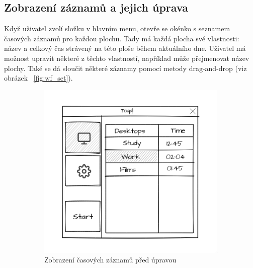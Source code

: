\documentclass[thesis=B,czech]{FITthesis}[2012/06/26]
\begin{document}
\subsection{Zobrazení záznamů a jejich úprava}

Když uživatel zvolí složku  v hlavním menu, otevře se okénko s seznamem časových záznamů pro každou plochu. Tady má každá plocha své vlastnosti: název a celkový čas strávený na této ploše během aktuálního dne.
Uživatel má možnost upravit některé z těchto vlastností, například může přejmenovat název plochy. Také se dá sloučit některé záznamy pomocí metody drag-and-drop (viz obrázek ~\ref{fig:wf_set}). 

\begin{figure}
	\begin{subfigure}[h]{0.51\linewidth}
		\includegraphics[width=\linewidth]{wf_list.png}
		\caption{Zobrazení časových záznamů před úpravou}
	\end{subfigure}
	\hfill
	\begin{subfigure}[h]{0.5\linewidth}

\end{subfigure}
\end{figure}
\end{document}
